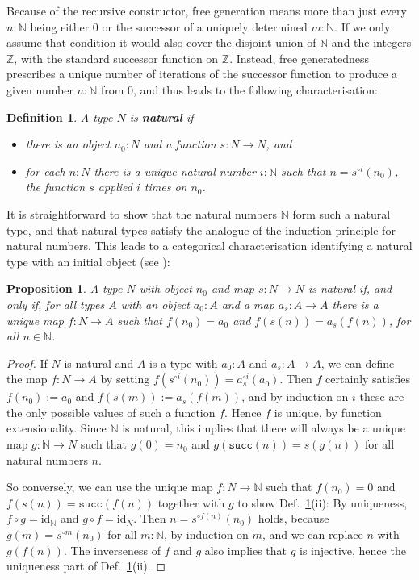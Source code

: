 \documentclass{amsart}
\theoremstyle{plain}
\numberwithin{equation}{section} %
\numberwithin{figure}{section} %
\theoremstyle{plain}
\theoremstyle{plain}
\theoremstyle{plain}
\theoremstyle{plain}
\theoremstyle{plain}
\newtheorem{prop}[thm]{Proposition} %
\theoremstyle{plain}
\newtheorem{Def}[thm]{Definition} %
\theoremstyle{remark}
\theoremstyle{remark}
\theoremstyle{remark}
\begin{document}
Because of the recursive constructor, free generation means more than just every $n : \mathbb{N}$ being either $0$ or the successor of a uniquely determined $m : \mathbb{N}$. If we only assume that condition it would also cover the disjoint union of $\mathbb{N}$ and the integers $\mathbb{Z}$, with the standard successor function on $\mathbb{Z}$. Instead, free generatedness prescribes a unique number of iterations of the successor function to produce a given number $n : \mathbb{N}$ from $0$, and thus leads to the following characterisation:
\begin{Def} \label{nat-cons-def}  %
A type $N$ is \textbf{natural} if
\begin{itemize}
\item[(i)] there is an object $n_0 : N$ and a function $s : N \rightarrow N$, and
\item[(ii)] for each $n : N$ there is a unique natural number $i : \mathbb{N}$ such that $n = s^{\circ i}(n_0)$, the function $s$ applied $i$ times on $n_0$.
\end{itemize}
\end{Def}

It is straightforward to show that the natural numbers $\mathbb{N}$ form such a natural type, 
and that natural types satisfy the analogue of the induction principle for natural numbers. This leads to a categorical characterisation identifying a natural type with an initial object (see \cite[5.4]{HoTTBook}):
\begin{prop} \label{nat-ind-def}  %
A type $N$ with object $n_0$ and map $s : N \rightarrow N$ is natural if, and only if, for all types $A$ with an object $a_0 : A$ and a map $a_s : A \rightarrow A$ there is a unique map $f : N \rightarrow A$ such that $f(n_0) = a_0$ and $f(s(n)) = a_s(f(n))$, for all $n \in \mathbb{N}$. 
\end{prop}
\begin{proof}
If $N$ is natural and $A$ is a type with $a_0 : A$ and $a_s : A \rightarrow A$, we can define the map $f : N \rightarrow A$ by setting $f(s^{\circ i}(n_0)) = a_s^{\circ i}(a_0)$. Then $f$ certainly satisfies 
$f(n_0) := a_0$ and $f(s(m)) := a_s(f(m))$, and by induction on $i$ these are the only possible values of such a function $f$. Hence $f$ is unique, by function extensionality. Since $\mathbb{N}$ is natural, this implies that there will always be a unique map $g : \mathbb{N} \rightarrow N$ such that $g(0) = n_0$ and $g(\mathtt{succ}(n)) = s(g(n))$ for all natural numbers $n$.

So conversely, we can use the unique map $f : N \rightarrow \mathbb{N}$ such that $f(n_0) = 0$ and $f(s(n)) = \mathtt{succ}(f(n))$ together with $g$ to show Def.~\ref{nat-cons-def}(ii): By uniqueness, $f \circ g = \mathrm{id}_{\mathbb{N}}$ and $g \circ f = \mathrm{id}_N$. Then $n = s^{\circ f(n)}(n_0)$ holds, because $g(m) = s^{\circ m}(n_0)$ for all $m : \mathbb{N}$, by induction on $m$, and we can replace $n$ with $g(f(n))$. The inverseness of $f$ and $g$ also implies that $g$ is injective, hence the uniqueness part of
Def.~\ref{nat-cons-def}(ii).
\end{proof} 
\end{document}
